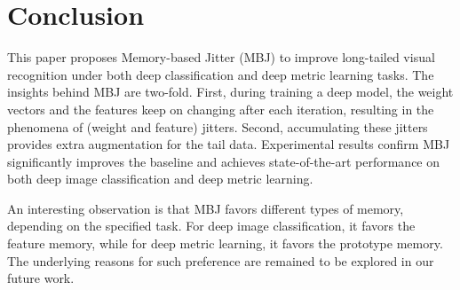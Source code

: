 \documentclass[final]{cvpr}
\begin{document}
\section{Conclusion}
This paper proposes Memory-based Jitter (MBJ) to improve long-tailed visual recognition under both deep classification and deep metric learning tasks. The insights behind MBJ are two-fold. First, during training a deep model, the weight vectors and the features keep on changing after each iteration, resulting in the phenomena of (weight and feature) jitters.
Second, accumulating these jitters provides extra augmentation for the tail data. Experimental results confirm MBJ significantly improves the baseline and achieves state-of-the-art performance on both deep image classification and deep metric learning. 

An interesting observation is that MBJ favors different types of memory, depending on the specified task. For deep image classification, it favors the feature memory, while for deep metric learning, it favors the prototype memory. The underlying reasons for such preference are remained to be explored in our future work.

{\small


}
\end{document}
